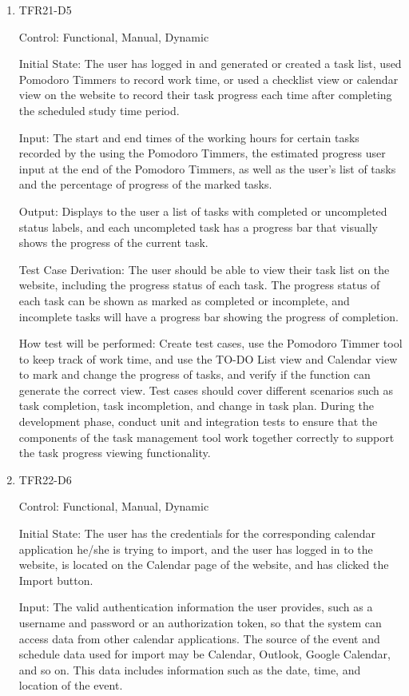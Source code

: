 \documentclass[12pt, titlepage]{article}
\begin{document}
\begin{enumerate}
\item{TFR21-D5\\}

Control: Functional, Manual, Dynamic
					
Initial State: The user has logged in and generated or created a task list, used Pomodoro Timmers to record work time, or used a checklist view or calendar view on the website to record their task progress each time after completing the scheduled study time period.
					
Input: The start and end times of the working hours for certain tasks recorded by the using the Pomodoro Timmers, the estimated progress user input at the end of the Pomodoro Timmers, as well as the user's list of tasks and the percentage of progress of the marked tasks.
					
Output: Displays to the user a list of tasks with completed or uncompleted status labels, and each uncompleted task has a progress bar that visually shows the progress of the current task.

Test Case Derivation: The user should be able to view their task list on the website, including the progress status of each task. The progress status of each task can be shown as marked as completed or incomplete, and incomplete tasks will have a progress bar showing the progress of completion.
					
How test will be performed: Create test cases, use the Pomodoro Timmer tool to keep track of work time, and use the TO-DO List view and Calendar view to mark and change the progress of tasks, and verify if the function can generate the correct view. Test cases should cover different scenarios such as task completion, task incompletion, and change in task plan. During the development phase, conduct unit and integration tests to ensure that the components of the task management tool work together correctly to support the task progress viewing functionality.

\item{TFR22-D6\\}

Control: Functional, Manual, Dynamic
					
Initial State: The user has the credentials for the corresponding calendar application he/she is trying to import, and the user has logged in to the website, is located on the Calendar page of the website, and has clicked the Import button.
					
Input: The valid authentication information the user provides, such as a username and password or an authorization token, so that the system can access data from other calendar applications. The source of the event and schedule data used for import may be Calendar, Outlook, Google Calendar, and so on. This data includes information such as the date, time, and location of the event. 
					

\end{enumerate}
\end{document}
